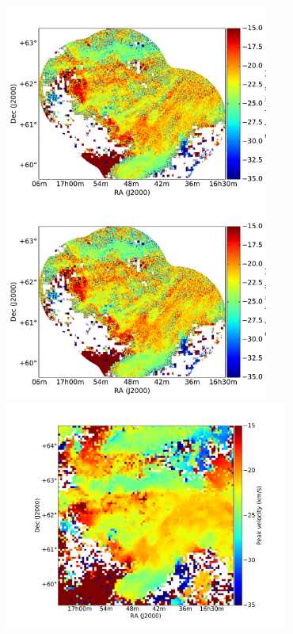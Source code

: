 \documentclass[traditabstract]{aa}
\begin{document}
\begin{figure}[h]
  \centering
  \includegraphics[page=1,height=6.5cm,trim=45 50 55 95,clip=true]{Figures/DHIGLS_velo.pdf}
  \hspace{3mm}                                
  \includegraphics[page=3,height=6.5cm,trim=45 50 55 95,clip=true]{Figures/DHIGLS_velo.pdf} \\
  \vspace{3mm}                                
  \includegraphics[page=4,height=7.5cm,trim=110 30 120 75,clip=true]{Figures/GHIGLS_velo.pdf}
  \hspace{3mm}                                

\end{figure}
\end{document}
